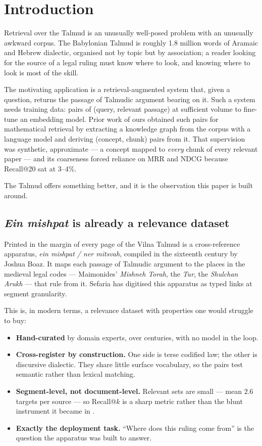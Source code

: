 \documentclass[11pt,a4paper]{article}
\begin{document}
\section{Introduction}

Retrieval over the Talmud is an unusually well-posed problem with an unusually
awkward corpus. The Babylonian Talmud is roughly 1.8 million words of Aramaic and
Hebrew dialectic, organised not by topic but by association; a reader looking for
the source of a legal ruling must know where to look, and knowing where to look
is most of the skill.

The motivating application is a retrieval-augmented system that, given a
question, returns the passage of Talmudic argument bearing on it. Such a system
needs training data: pairs of (query, relevant passage) at sufficient volume to
fine-tune an embedding model. Prior work of ours \cite{mathembed} obtained such
pairs for mathematical retrieval by extracting a knowledge graph from the corpus
with a language model and deriving (concept, chunk) pairs from it. That
supervision was synthetic, approximate --- a concept mapped to \emph{every} chunk
of every relevant paper --- and its coarseness forced reliance on MRR and NDCG
because Recall@20 sat at 3--4\%.

The Talmud offers something better, and it is the observation this paper is built
around.

\subsection{\emph{Ein mishpat} is already a relevance dataset}

Printed in the margin of every page of the Vilna Talmud is a cross-reference
apparatus, \emph{ein mishpat / ner mitsvah}, compiled in the sixteenth century by
Joshua Boaz. It maps each passage of Talmudic argument to the places in the
medieval legal codes --- Maimonides' \emph{Mishneh Torah}, the \emph{Tur}, the
\emph{Shulchan Arukh} --- that rule from it. Sefaria has digitised this apparatus
as typed links at segment granularity.

This is, in modern terms, a relevance dataset with properties one would struggle
to buy:

\begin{itemize}[itemsep=2pt]
\item \textbf{Hand-curated} by domain experts, over centuries, with no
      model in the loop.
\item \textbf{Cross-register by construction.} One side is terse codified law;
      the other is discursive dialectic. They share little surface vocabulary,
      so the pairs test semantic rather than lexical matching.
\item \textbf{Segment-level, not document-level.} Relevant sets are small ---
      mean $2.6$ targets per source --- so Recall@$k$ is a sharp metric rather
      than the blunt instrument it became in \cite{mathembed}.
\item \textbf{Exactly the deployment task.} ``Where does this ruling come from''
      is the question the apparatus was built to answer.
\end{itemize}
\end{document}
